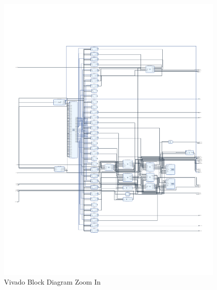 \begin{landscape}\centering
\begin{figure}[h]
\centerline{\includegraphics[scale=2]{4-ANC_Sys/VivadoBD_ZoomIn.pdf}}
\caption{Vivado Block Diagram Zoom In}
\label{fig_VivadoBD_ZoomIn}
\end{figure}
\end{landscape}

